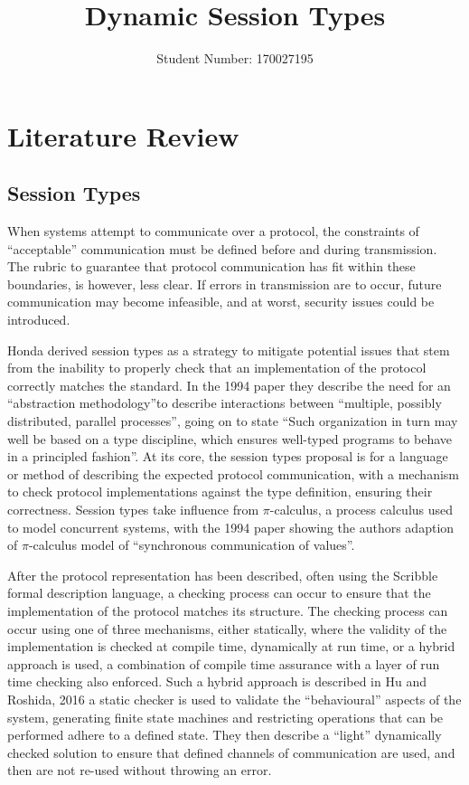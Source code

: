 \documentclass{article}
\author{Student Number: 170027195}
\title{Dynamic Session Types}
\begin{document}
	\maketitle
	\pagebreak
	\tableofcontents
	\pagebreak
	\section{Literature Review}
	\subsection{Session Types} \label{session types}
	When systems attempt to communicate over a protocol, the constraints of “acceptable” communication must be defined before and during transmission. The rubric to guarantee that protocol communication has fit within these boundaries, is however, less clear. If errors in transmission are to occur, future communication may become infeasible, and at worst, security issues could be introduced.
	
	Honda derived session types\cite{honda1993types}\cite{takeuchi1994interaction}\cite{honda1998language} as a strategy to mitigate potential issues that stem from the inability to properly check that an implementation of the protocol correctly matches the standard. In the 1994 paper\cite{takeuchi1994interaction} they describe the need for an ``abstraction methodology''to describe interactions between ``multiple, possibly distributed, parallel	processes'', going on to state ``Such organization in turn may well be based on a type discipline, which ensures well-typed programs to behave in a principled fashion''. At its core, the session types proposal is for a language or method of describing the expected protocol communication, with a mechanism to check protocol implementations against the type definition, ensuring their correctness. 	Session types take influence from $\pi$-calculus\cite{milner1999communicating}, a process calculus used to model concurrent systems, with the 1994 paper\cite{takeuchi1994interaction} showing the authors adaption of $\pi$-calculus model of ``synchronous communication of values''.
	
	After the protocol representation has been described, often using the Scribble formal description language\cite{honda2011scribbling}, a checking process can occur to ensure that the implementation of the protocol matches its structure. The checking process can occur using one of three mechanisms, either statically, where the validity of the implementation is checked at compile time, dynamically at run time, or a hybrid approach is used, a combination of compile time assurance with a layer of run time checking also enforced. Such a hybrid approach is described in Hu and Roshida, 2016\cite{hu2016hybrid} a static checker is used to validate the ``behavioural'' aspects of the system, generating finite state machines and restricting operations that can be performed adhere to a defined state. They then describe a ``light'' dynamically checked solution to ensure that defined channels of communication are used, and then are not re-used without throwing an error.
	
\end{document}
